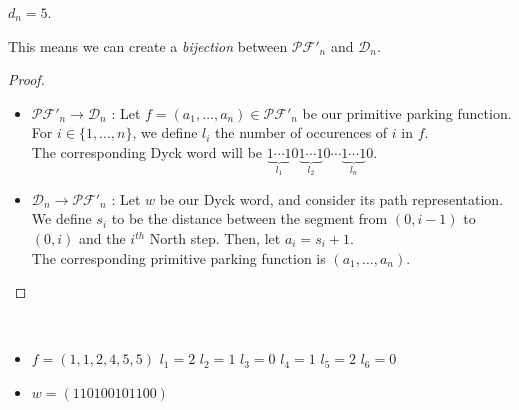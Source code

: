 \begin{example}[$n = 3$]
    $d_n = 5$.
    \begin{center}
        
        
        
        
        
    \end{center}
\end{example}

\begin{prop}
    This means we can create a \emph{bijection} between
    $\mathcal{PF'}_n$ and $\mathcal{D}_n$.
\end{prop}

\begin{proof}
    ~\
\begin{itemize}
    \item $\mathcal{PF'}_n \to \mathcal{D}_n$ :
    Let $f = (a_1, \ldots, a_n) \in \mathcal{PF'}_n$
    be our primitive parking function.
    For $i \in \{1, \ldots, n\}$, we define $l_i$ the
    number of occurences of $i$ in $f$.\\
    The corresponding Dyck word will be
    $\underbrace{1 \cdots 1}_{l_1}0
     \underbrace{1 \cdots 1}_{l_2}0 \cdots
     \underbrace{1 \cdots 1}_{l_n}0$.
    
    \item $\mathcal{D}_n \to \mathcal{PF'}_n$ :
    Let $w$ be our Dyck word, and consider its path
    representation. We define $s_i$ to be the distance
    between the segment from $(0, i - 1)$ to $(0, i)$
    and the $i^{th}$ North step. Then, let $a_i = s_i + 1$.\\
    The corresponding primitive parking function is 
    $(a_1, \ldots, a_n)$.
\end{itemize}
\end{proof}

\begin{example}[$n = 6, \mathcal{PF'}_n \to \mathcal{D}_n$]
    ~\
    \begin{itemize}
        \item $f = (1, 1, 2, 4, 5, 5)$
            \subitem $l_1 = 2$
            \hspace{2cm} $l_2 = 1$
            \hspace{2cm} $l_3 = 0$
            \subitem $l_4 = 1$
            \hspace{2cm} $l_5 = 2$
            \hspace{2cm} $l_6 = 0$
        \item $w = (110100101100)$
    \end{itemize}
    
\end{example}

